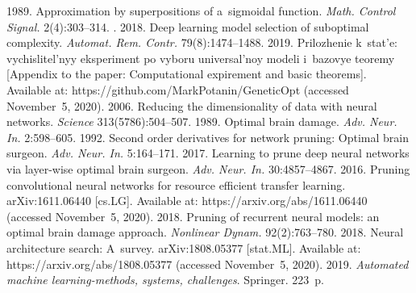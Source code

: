   \begin{multicols}{2}

\renewcommand{\bibname}{\protect\rmfamily References}

{\small\frenchspacing
 {\baselineskip=10.3pt
 \begin{thebibliography}{99}

 1989. Approximation by superpositions of a~sigmoidal function. \textit{Math. 
Control Signal.} 2(4):303--314.
. 2018. Deep learning model selection of suboptimal 
complexity. \textit{Automat. Rem. Contr.} 79(8):1474--1488.
 2019. Prilozhenie 
k~stat'e: vy\-chis\-li\-tel'\-nyy eksperiment po vyboru universal'noy modeli i~ba\-zo\-vye teoremy [Appendix to 
the paper: Computational expirement and basic theorems]. Available at: {\sf  
https://github.com/MarkPotanin/GeneticOpt} (accessed November~5, 2020).
 2006. Reducing the dimensionality of data with neural 
networks. \textit{Science} 313(5786):504--507.
 1989. Optimal brain damage. \textit{Adv. Neur. In.} 2:598--605.
 1992. Second order derivatives for network pruning: Optimal brain 
surgeon. \textit{Adv. Neur. In.} 5:164--171.
 2017. Learning to prune deep neural networks via layer-wise 
optimal brain surgeon. \textit{Adv. Neur. In.} 30:4857--4867.
 2016. Pruning convolutional neural networks for resource efficient 
transfer learning. arXiv:1611.06440 [cs.LG]. Available at: {\sf https://arxiv.org/abs/1611.06440} 
(accessed November~5, 2020).
 2018. Pruning of recurrent neural models: an 
optimal brain damage approach. \textit{Nonlinear Dynam.} 92(2):763--780.
 2018. Neural architecture search: A~survey. 
arXiv:1808.05377 [stat.ML]. Available at: {\sf https://arxiv.org/abs/1808.05377} (accessed November~5, 
2020).
 2019. \textit{Automated machine learning-methods, 
systems, challenges}. Springer. 223~p.

\end{thebibliography}}}
\end{multicols}
